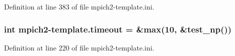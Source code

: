 Definition at line 383 of file mpich2-\/template.\-ini.

\hypertarget{namespacempich2-template_a59c507b362aba1d2422478a441eb13bc}{
\subsubsection[{timeout}]{\setlength{\rightskip}{0pt plus 5cm}int mpich2-\/template.\-timeout = \&max(10, \&test\-\_\-np())}}\label{namespacempich2-template_a59c507b362aba1d2422478a441eb13bc}


Definition at line 220 of file mpich2-\/template.\-ini.

